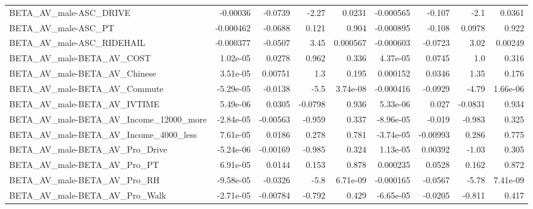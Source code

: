 \begin{tabular}{lrrrrrrrr}
BETA\_AV\_male-ASC\_DRIVE                             &    -0.00036 &      -0.0739 &     -2.27 &   0.0231 &  -0.000565 &      -0.107 &         -2.1 &        0.0361 \\
BETA\_AV\_male-ASC\_PT                                &   -0.000462 &      -0.0688 &     0.121 &    0.904 &  -0.000895 &      -0.108 &       0.0978 &         0.922 \\
BETA\_AV\_male-ASC\_RIDEHAIL                          &   -0.000377 &      -0.0507 &      3.45 & 0.000567 &  -0.000603 &     -0.0723 &         3.02 &       0.00249 \\
BETA\_AV\_male-BETA\_AV\_COST                          &    1.02e-05 &       0.0278 &     0.962 &    0.336 &   4.37e-05 &      0.0745 &          1.0 &         0.316 \\
BETA\_AV\_male-BETA\_AV\_Chinese                       &    3.51e-05 &      0.00751 &       1.3 &    0.195 &   0.000152 &      0.0346 &         1.35 &         0.176 \\
BETA\_AV\_male-BETA\_AV\_Commute                       &   -5.29e-05 &      -0.0138 &      -5.5 & 3.74e-08 &  -0.000416 &     -0.0929 &        -4.79 &      1.66e-06 \\
BETA\_AV\_male-BETA\_AV\_IVTIME                        &    5.49e-06 &       0.0305 &   -0.0798 &    0.936 &   5.33e-06 &       0.027 &      -0.0831 &         0.934 \\
BETA\_AV\_male-BETA\_AV\_Income\_12000\_more             &   -2.84e-05 &     -0.00563 &    -0.959 &    0.337 &  -8.96e-05 &      -0.019 &       -0.983 &         0.325 \\
BETA\_AV\_male-BETA\_AV\_Income\_4000\_less              &    7.61e-05 &       0.0186 &     0.278 &    0.781 &  -3.74e-05 &    -0.00993 &        0.286 &         0.775 \\
BETA\_AV\_male-BETA\_AV\_Pro\_Drive                     &   -5.24e-06 &     -0.00169 &    -0.985 &    0.324 &   1.13e-05 &     0.00392 &        -1.03 &         0.305 \\
BETA\_AV\_male-BETA\_AV\_Pro\_PT                        &    6.91e-05 &       0.0144 &     0.153 &    0.878 &   0.000235 &      0.0528 &        0.162 &         0.872 \\
BETA\_AV\_male-BETA\_AV\_Pro\_RH                        &   -9.58e-05 &      -0.0326 &      -5.8 & 6.71e-09 &  -0.000165 &     -0.0567 &        -5.78 &      7.41e-09 \\
BETA\_AV\_male-BETA\_AV\_Pro\_Walk                      &   -2.71e-05 &     -0.00784 &    -0.792 &    0.429 &  -6.65e-05 &     -0.0205 &       -0.811 &         0.417 \\

\end{tabular}
